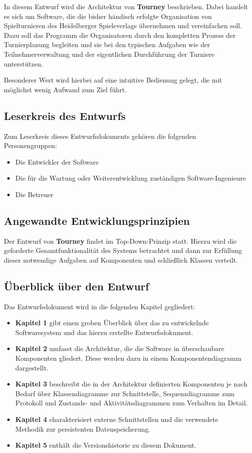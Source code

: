 \documentclass[11pt]{article}
\begin{document}
In diesem Entwurf wird die Architektur von \textbf{Tourney} beschrieben. Dabei handelt es sich um Software, die die bisher händisch erfolgte Organisation von Spielturnieren des Heidelberger Spieleverlags übernehmen und vereinfachen soll. Dazu soll das Programm die Organisatoren durch den kompletten Prozess der Turnierplanung begleiten und sie bei den typischen Aufgaben wie der Teilnehmerverwaltung und der eigentlichen Durchführung der Turniere unterstützen.

Besonderer Wert wird hierbei auf eine intuitive Bedienung gelegt, die mit möglichst wenig Aufwand zum Ziel führt.

\subsection{Leserkreis des Entwurfs}

Zum Leserkreis dieses Entwurfsdokuments gehören die folgenden Personengruppen:
\begin{itemize}
	\item Die Entwickler der Software
	\item Die für die Wartung oder Weiterentwicklung zuständigen Software-Ingenieure
	\item Die Betreuer
\end{itemize}

\subsection{Angewandte Entwicklungsprinzipien}

Der Entwurf von \textbf{Tourney} findet im Top-Down-Prinzip statt. Hierzu wird die geforderte Gesamtfunktionalität des Systems betrachtet und dann zur Erfüllung dieser notwendige Aufgaben auf Komponenten und schließlich Klassen verteilt.

\newpage

\subsection{Überblick über den Entwurf}

Das Entwurfsdokument wird in die folgenden Kapitel gegliedert:
\begin{itemize}
	\item[] \textbf{Kapitel 1} gibt einen groben Überblick über das zu entwickelnde Softwaresystem und das hierzu erstellte Entwurfsdokument.
	\item[] \textbf{Kapitel 2} umfasst die Architektur, die die Software in überschaubare Komponenten gliedert. Diese werden dazu in einem Komponentendiagramm dargestellt.
	\item[] \textbf{Kapitel 3} beschreibt die in der Architektur definierten Komponenten je nach Bedarf über Klassendiagramme zur Schnittstelle, Sequenzdiagramme zum Protokoll und Zustands- und Aktivitätsdiagrammen zum Verhalten im Detail.
	\item[] \textbf{Kapitel 4} charakterisiert externe Schnittstellen und die verwendete Methodik zur persistenten Datenspeicherung.
	\item[] \textbf{Kapitel 5} enthält die Versionshistorie zu diesem Dokument.
\end{itemize}
\end{document}
